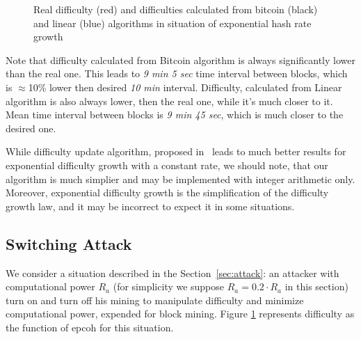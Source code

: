\documentclass[]{llncs}
\begin{document}
\begin{figure}[h]
\caption{Real difficulty (red) and difficulties calculated from bitcoin (black) and linear (blue) algorithms in situation of exponential hash rate growth}
\label{fig:exp}
\end{figure}

Note that difficulty calculated from Bitcoin algorithm is always significantly lower than the real one.
This leads to \textit{9 min 5 sec} time interval between blocks, which is $\approx$10\% lower then desired \textit{10 min} interval.
Difficulty, calculated from Linear algorithm is also always lower, then the real one, while it's much closer to it.
Mean time interval between blocks is \textit{9 min 45 sec}, which is much closer to the desired one.

While difficulty update algorithm, proposed in~\cite{kraft2015difficulty} leads to much better results for exponential difficulty growth with a constant rate, we should note, that our algorithm is much simplier and may be implemented with integer arithmetic only.
Moreover, exponential difficulty growth is the simplification of the difficulty growth law, and it may be incorrect to expect it in some situations.

\subsection{Switching Attack}

We consider a situation described in the Section~\ref{sec:attack}: an attacker with computational power \(R_a\) (for simplicity we suppose \(R_a=0.2 \cdot R_a \) in this section) turn on and turn off his mining to manipulate difficulty and minimize computational power, expended for block mining.
Figure \ref{fig:exp} represents difficulty as the function of epcoh for this situation.
\end{document}
